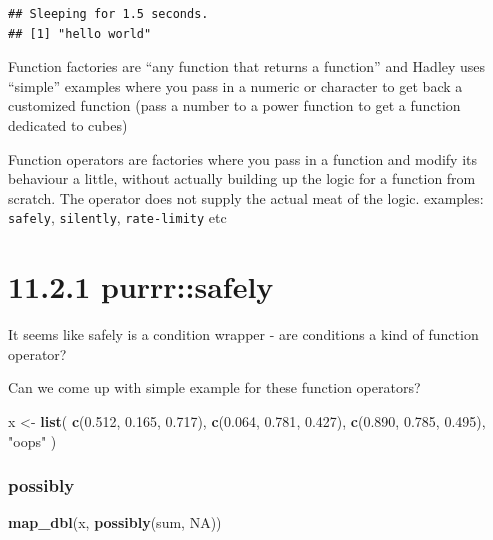 \documentclass[]{book}
\newenvironment{Shaded}{\begin{snugshade}}{\end{snugshade}}
\newcommand{\FloatTok}[1]{\textcolor[rgb]{0.00,0.00,0.81}{#1}}
\newcommand{\KeywordTok}[1]{\textcolor[rgb]{0.13,0.29,0.53}{\textbf{#1}}}
\newcommand{\NormalTok}[1]{#1}
\newcommand{\OtherTok}[1]{\textcolor[rgb]{0.56,0.35,0.01}{#1}}
\newcommand{\StringTok}[1]{\textcolor[rgb]{0.31,0.60,0.02}{#1}}
\begin{document}
\begin{verbatim}
## Sleeping for 1.5 seconds.
## [1] "hello world"
\end{verbatim}

Function factories are ``any function that returns a function'' and Hadley uses ``simple'' examples where you pass in a numeric or character to get back a customized function (pass a number to a power function to get a function dedicated to cubes)

Function operators are factories where you pass in a function and modify its behaviour a little, without actually building up the logic for a function from scratch. The operator does not supply the actual meat of the logic.
examples: \texttt{safely}, \texttt{silently}, \texttt{rate-limity} etc

\hypertarget{purrrsafely}{%
\section*{11.2.1 purrr::safely}\label{purrrsafely}}

It seems like safely is a condition wrapper - are conditions a kind of function operator?

Can we come up with simple example for these function operators?

\begin{Shaded}
\begin{Highlighting}[]
\NormalTok{x <-}\StringTok{ }\KeywordTok{list}\NormalTok{(}
  \KeywordTok{c}\NormalTok{(}\FloatTok{0.512}\NormalTok{, }\FloatTok{0.165}\NormalTok{, }\FloatTok{0.717}\NormalTok{),}
  \KeywordTok{c}\NormalTok{(}\FloatTok{0.064}\NormalTok{, }\FloatTok{0.781}\NormalTok{, }\FloatTok{0.427}\NormalTok{),}
  \KeywordTok{c}\NormalTok{(}\FloatTok{0.890}\NormalTok{, }\FloatTok{0.785}\NormalTok{, }\FloatTok{0.495}\NormalTok{),}
  \StringTok{"oops"}
\NormalTok{)}
\end{Highlighting}
\end{Shaded}

\hypertarget{possibly}{%
\subsubsection*{possibly}\label{possibly}}

\begin{Shaded}
\begin{Highlighting}[]
\KeywordTok{map_dbl}\NormalTok{(x, }\KeywordTok{possibly}\NormalTok{(sum, }\OtherTok{NA}\NormalTok{))}
\end{Highlighting}
\end{Shaded}
\end{document}
